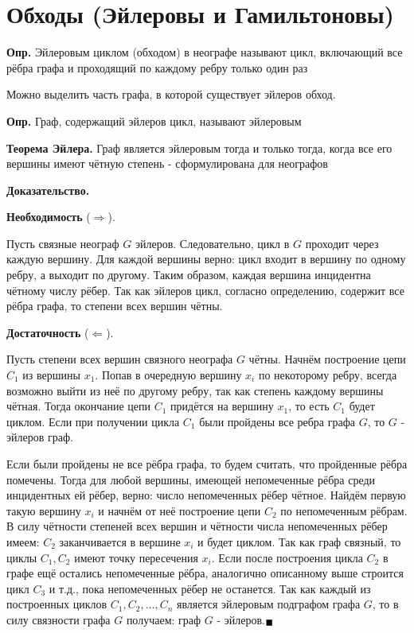 \documentclass[10pt]{article}
\begin{document}
\section*{Обходы (Эйлеровы и Гамильтоновы)}
\par\textbf{Опр.} Эйлеровым циклом (обходом) в неографе называют цикл, включающий все рёбра графа и проходящий по каждому ребру только один раз
\par Можно выделить часть графа, в которой существует эйлеров обход.
\par\textbf{Опр.} Граф, содержащий эйлеров цикл, называют эйлеровым
\par\textbf{Теорема Эйлера.} Граф является эйлеровым тогда и только тогда, когда все его вершины имеют чётную степень - сформулирована для неографов
\par\textbf{Доказательство.}
\par\textbf{Необходимость} ($\Rightarrow$).
\par Пусть связные неограф $G$ эйлеров. Следовательно, цикл в $G$ проходит через каждую вершину. Для каждой вершины верно: цикл входит в вершину по одному ребру, а выходит по другому. Таким образом, каждая вершина инцидентна чётному числу рёбер. Так как эйлеров цикл, согласно определению, содержит все рёбра графа, то степени всех вершин чётны.
\par\textbf{Достаточность} ($\Leftarrow$).
\par Пусть степени всех вершин связного неографа $G$ чётны. Начнём построение цепи $C_{1}$ из вершины $x_{1}$. Попав в очередную вершину $x_{i}$ по некоторому ребру, всегда возможно выйти из неё по другому ребру, так как степень каждому вершины чётная. Тогда окончание цепи $C_{1}$ придётся на вершину $x_{1}$, то есть $C_{1}$ будет циклом. Если при получении цикла $C_{1}$ были пройдены все ребра графа $G$, то $G$ - эйлеров граф.
\par Если были пройдены не все рёбра графа, то будем считать, что пройденные рёбра помечены. Тогда для любой вершины, имеющей непомеченные рёбра среди инцидентных ей рёбер, верно: число непомеченных рёбер чётное. Найдём первую такую вершину $x_{i}$ и начнём от неё построение цепи $C_{2}$ по непомеченным рёбрам. В силу чётности степеней всех вершин и чётности числа непомеченных рёбер имеем: $C_{2}$ заканчивается в вершине $x_{i}$ и будет циклом. Так как граф связный, то циклы $C_{1}, C_{2}$ имеют точку пересечения $x_{i}$. Если после построения цикла $C_{2}$ в графе ещё остались непомеченные рёбра, аналогично описанному выше строится цикл $C_{3}$ и т.д., пока непомеченных рёбер не останется. Так как каждый из построенных циклов $C_{1}, C_{2}, \dots, C_{n}$ является эйлеровым подграфом графа $G$, то в силу связности графа $G$ получаем: граф $G$ - эйлеров.$\large_{\blacksquare}$
\end{document}
